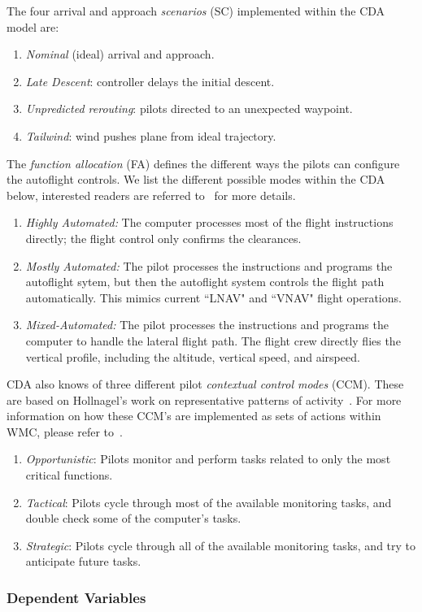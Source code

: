 \documentclass[journal]{IEEEtran}
\newcommand{\be}{\begin{enumerate}}
\newcommand{\ee}{\end{enumerate}}
\newenvironment{changed}{\par}{\par}
\begin{document}
\begin{changed}
The four arrival and approach \emph{scenarios} (SC) implemented within the CDA model are:
    \be
    \item{\em Nominal} (ideal) arrival and approach.
    \item{\em Late Descent}: controller delays the initial descent.
    \item{\em Unpredicted rerouting}:  pilots  directed to an unexpected waypoint.
    \item{\em Tailwind}: wind  pushes  plane from  ideal trajectory.
    \ee
The {\em function allocation} (FA) defines the different ways the pilots can configure the autoflight controls.  We list the different possible modes within the CDA below, interested readers are referred to~\cite{Pritchett2014} for more details.
    \be
    \item{\em Highly Automated:} The computer processes most of the flight instructions directly; the flight control only confirms the clearances.
    \item{\em Mostly Automated:} The pilot processes the instructions and programs the autoflight sytem, but then the autoflight system controls the flight path automatically.  This mimics current ``LNAV" and ``VNAV" flight operations.
    \item{\em Mixed-Automated:} The pilot processes the instructions and programs the computer to handle the lateral flight path. The flight crew directly flies the vertical profile, including the altitude, vertical speed, and airspeed.
    \ee
CDA also knows of three different pilot {\em contextual control modes} (CCM).  These are based on Hollnagel's work on representative patterns of activity~\cite{Hollnagel1993}. For more information on how these CCM's are implemented as sets of actions within WMC, please refer to~\cite{Feigh2014}.
    \be
    \item{\em Opportunistic}:  Pilots monitor and perform tasks related to only the most critical functions.
    \item{\em Tactical}: Pilots cycle through most of the available monitoring tasks, and double check some of the computer's tasks.
    \item{\em Strategic}: Pilots cycle through all of the available monitoring tasks, and try to anticipate future tasks.
    \ee
\end{changed}

\subsubsection{Dependent Variables}
\end{document}
